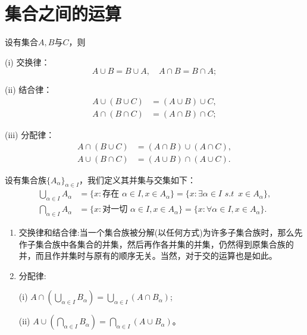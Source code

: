 \documentclass[lang=cn,newtx,10pt,scheme=chinese]{../Template/elegantbook}
\begin{document}
\section{集合之间的运算}

\begin{theorem}\label{theorem:集合运算的基本性质}
设有集合\(A,B\)与\(C\)，则

(i) 交换律：
\[A\cup B = B\cup A, \quad A\cap B = B\cap A;\]

(ii) 结合律：
\begin{align*}
  A\cup(B\cup C)&=(A\cup B)\cup C,\\
A\cap(B\cap C)&=(A\cap B)\cap C;
\end{align*}

(iii) 分配律：
\begin{align*}
A\cap(B\cup C)&=(A\cap B)\cup(A\cap C),\\
A\cup(B\cap C)&=(A\cup B)\cap(A\cup C).
\end{align*}
\end{theorem}

\begin{definition}[集族的并和交]\label{definition:集族的并和交}
设有集合族\(\{A_{\alpha}\}_{\alpha\in I}\)，我们定义其并集与交集如下：
\begin{align*}
\bigcup_{\alpha\in I}A_{\alpha}&=\{x:\text{存在 }\alpha\in I,x\in A_{\alpha}\}=\{x:\exists \alpha \in I\,\,s.t\,\,\,x\in A_{\alpha}\},\\
\bigcap_{\alpha\in I}A_{\alpha}&=\{x:\text{对一切 }\alpha\in I,x\in A_{\alpha}\}=\{x:\forall \alpha \in I,x\in A_{\alpha}\}.
\end{align*}
\end{definition}

\begin{theorem}\label{theorem:集族的并和交的基本性质}
\begin{enumerate}
  \item 交换律和结合律:当一个集合族被分解(以任何方式)为许多子集合族时，那么先作子集合族中各集合的并集，然后再作各并集的并集，仍然得到原集合族的并，而且作并集时与原有的顺序无关。当然，对于交的运算也是如此。

  \item 分配律:

  (i) \(A\cap\left(\bigcup_{\alpha\in I}B_{\alpha}\right)=\bigcup_{\alpha\in I}(A\cap B_{\alpha})\);

(ii) \(A\cup\left(\bigcap_{\alpha\in I}B_{\alpha}\right)=\bigcap_{\alpha\in I}(A\cup B_{\alpha})\)。
\end{enumerate}
\end{theorem}
\end{document}

